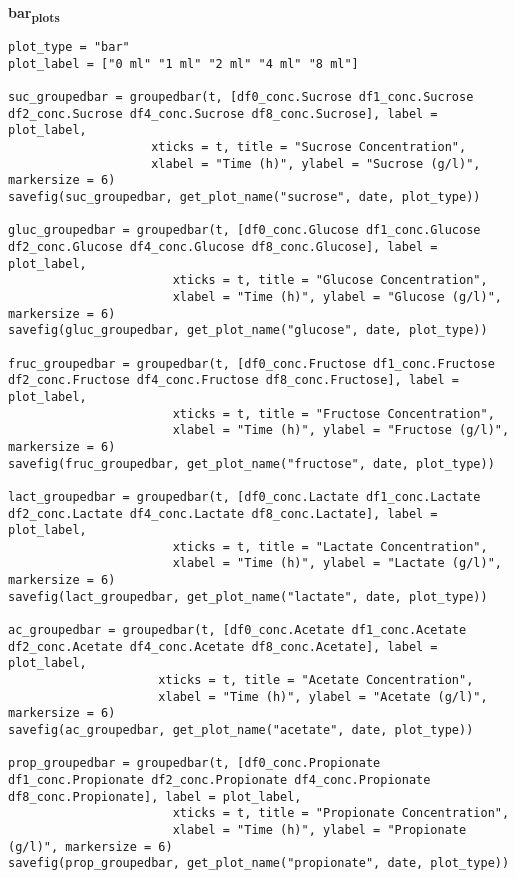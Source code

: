 \documentclass[11pt]{article}
\begin{document}
\textbf{bar\textsubscript{plots}}
\begin{verbatim}
plot_type = "bar"
plot_label = ["0 ml" "1 ml" "2 ml" "4 ml" "8 ml"]

suc_groupedbar = groupedbar(t, [df0_conc.Sucrose df1_conc.Sucrose df2_conc.Sucrose df4_conc.Sucrose df8_conc.Sucrose], label = plot_label,
                    xticks = t, title = "Sucrose Concentration",
                    xlabel = "Time (h)", ylabel = "Sucrose (g/l)", markersize = 6)
savefig(suc_groupedbar, get_plot_name("sucrose", date, plot_type))

gluc_groupedbar = groupedbar(t, [df0_conc.Glucose df1_conc.Glucose df2_conc.Glucose df4_conc.Glucose df8_conc.Glucose], label = plot_label,
                       xticks = t, title = "Glucose Concentration",
                       xlabel = "Time (h)", ylabel = "Glucose (g/l)", markersize = 6)
savefig(gluc_groupedbar, get_plot_name("glucose", date, plot_type))

fruc_groupedbar = groupedbar(t, [df0_conc.Fructose df1_conc.Fructose df2_conc.Fructose df4_conc.Fructose df8_conc.Fructose], label = plot_label,
                       xticks = t, title = "Fructose Concentration",
                       xlabel = "Time (h)", ylabel = "Fructose (g/l)", markersize = 6)
savefig(fruc_groupedbar, get_plot_name("fructose", date, plot_type))

lact_groupedbar = groupedbar(t, [df0_conc.Lactate df1_conc.Lactate df2_conc.Lactate df4_conc.Lactate df8_conc.Lactate], label = plot_label,
                       xticks = t, title = "Lactate Concentration",
                       xlabel = "Time (h)", ylabel = "Lactate (g/l)", markersize = 6)
savefig(lact_groupedbar, get_plot_name("lactate", date, plot_type))

ac_groupedbar = groupedbar(t, [df0_conc.Acetate df1_conc.Acetate df2_conc.Acetate df4_conc.Acetate df8_conc.Acetate], label = plot_label,
                     xticks = t, title = "Acetate Concentration",
                     xlabel = "Time (h)", ylabel = "Acetate (g/l)", markersize = 6)
savefig(ac_groupedbar, get_plot_name("acetate", date, plot_type))

prop_groupedbar = groupedbar(t, [df0_conc.Propionate df1_conc.Propionate df2_conc.Propionate df4_conc.Propionate df8_conc.Propionate], label = plot_label,
                       xticks = t, title = "Propionate Concentration",
                       xlabel = "Time (h)", ylabel = "Propionate (g/l)", markersize = 6)
savefig(prop_groupedbar, get_plot_name("propionate", date, plot_type))


\end{verbatim}
\end{document}
